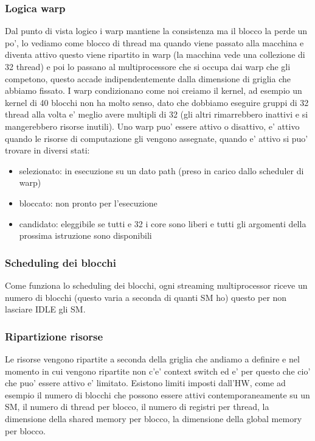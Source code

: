 \subsubsection{Logica warp}
Dal punto di vista logico i warp mantiene la consistenza ma il blocco la perde un po', lo vediamo come blocco di thread ma quando viene passato alla macchina e diventa attivo questo viene ripartito in warp (la macchina vede una collezione di 32 thread) e poi lo passano al multiprocessore che si occupa dai warp che gli competono, questo accade indipendentemente dalla dimensione di griglia che abbiamo fissato.
I warp condizionano come noi creiamo il kernel, ad esempio un kernel di 40 blocchi non ha molto senso, dato che dobbiamo eseguire gruppi di 32 thread alla volta e' meglio avere multipli di 32 (gli altri rimarrebbero inattivi e si mangerebbero risorse inutili).
Uno warp puo' essere attivo o disattivo, e' attivo quando le risorse di computazione gli vengono assegnate, quando e' attivo si puo' trovare in diversi stati:
\begin{itemize}
    \item selezionato: in esecuzione su un dato path (preso in carico dallo scheduler di warp)
    \item bloccato: non pronto per l'esecuzione
    \item candidato: eleggibile se tutti e 32 i core sono liberi e tutti gli argomenti della prossima istruzione sono disponibili
\end{itemize}

\subsubsection{Scheduling dei blocchi}
Come funziona lo scheduling dei blocchi, ogni streaming multiprocessor riceve un numero di blocchi (questo varia a seconda di quanti SM ho) questo per non lasciare IDLE gli SM.

\subsubsection{Ripartizione risorse}
Le risorse vengono ripartite a seconda della griglia che andiamo a definire e nel momento in cui vengono ripartite non c'e' context switch ed e' per questo che cio' che puo' essere attivo e' limitato.
Esistono limiti imposti dall'HW, come ad esempio il numero di blocchi che possono essere attivi contemporaneamente su un SM, il numero di thread per blocco, il numero di registri per thread, la dimensione della shared memory per blocco, la dimensione della global memory per blocco. 

